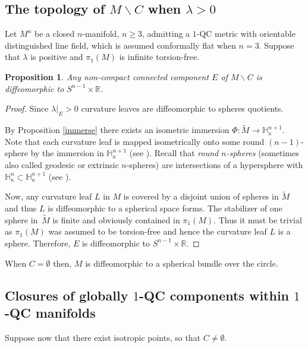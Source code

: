 \documentclass[JEP,XML,SOM,Unicode]{cedram}
\let\moins\smallsetminus
\newtheorem{proposition}[theorem]{Proposition}
\theoremstyle{definition}
\theoremstyle{remark}
\numberwithin{equation}{section}
\newcommand{\RR}{\mathbb R}
\begin{document}
\subsection{The topology of $M\moins C$ when $\lambda >0$}
Let $M^n$ be a closed $n$-manifold, $n\geq3$, admitting a $1$-QC metric with orientable distinguished line field, which is
assumed conformally flat when $n=3$.
Suppose that $\lambda$ is positive and $\pi_1(M)$ is infinite torsion-free.

\begin{proposition}\label{leaves}
Any non-compact connected component $E$ of $M\moins C$
is diffeomorphic to $S^{n-1}\times \RR$.
\end{proposition}
\begin{proof}
Since $\lambda|_E >0$ curvature leaves are
diffeomorphic to spheres quotients.

By Proposition \ref{immerse} there exists an isometric immersion
$\Phi: \widetilde{M}\to \mathbb H_{\kappa}^{n+1}$. Note that
each curvature leaf is mapped isometrically onto some round
$(n-1)$-sphere by the immersion in $\mathbb H_{\kappa}^{n+1}$
(see \eg \cite{Re2}). Recall that \emph{round $n$-spheres}
(sometimes also called geodesic or extrinsic $n$-spheres) are
intersections of a hypersphere with $\mathbb H_{\kappa}^{n}\subset \mathbb H_{\kappa}^{n+1}$ (see
\cite[\S2]{Re2}).

Now, any curvature leaf $L$ in $M$ is covered by
a disjoint union of spheres in $\widetilde{M}$ and thus $L$ is
diffeomorphic to a spherical space forms.
The stabilizer of one sphere in~$\widetilde{M}$
is finite and obviously contained in $\pi_1(M)$.
Thus it must be trivial as $\pi_1(M)$ was assumed to be torsion-free
and hence the curvature leaf $L$ is a sphere. Therefore, $E$ is diffeomorphic to $S^{n-1}\times \RR$.
\end{proof}
When $C=\emptyset$ then, $M$ is
diffeomorphic to a spherical bundle over the circle.

\subsection{Closures of globally $1$-QC components within $1$-QC manifolds}
Suppose now that there exist isotropic points, so
that $C\neq\emptyset$.
\end{document}
